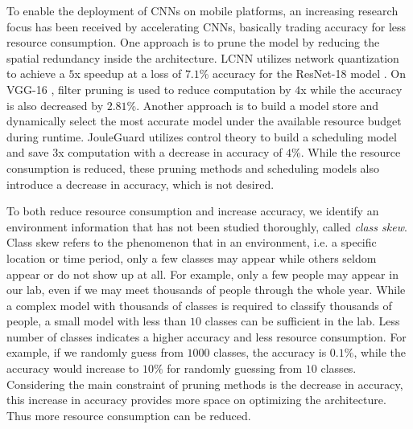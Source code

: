 \documentclass[pageno]{jpaper}
\begin{document}
To enable the deployment of CNNs on mobile platforms, an increasing research focus has been received by accelerating CNNs, basically trading accuracy for less resource consumption. One approach is to prune the model by reducing the spatial redundancy inside the architecture. LCNN \cite{bagherinezhad2017lcnn} utilizes network quantization to achieve a $5$x speedup at a loss of $7.1$\% accuracy for the ResNet-18 model \cite{he2016deep}. On VGG-16 \cite{simonyan2014very}, filter pruning \cite{lin2018accelerating} is used to reduce computation by $4$x while the accuracy is also decreased by $2.81$\%. Another approach is to build a model store and dynamically select the most accurate model under the available resource budget during runtime. JouleGuard \cite{hoffmann2015jouleguard} utilizes control theory to build a scheduling model and save $3$x computation with a decrease in accuracy of $4$\%. While the resource consumption is reduced, these pruning methods and scheduling models also introduce a decrease in accuracy, which is not desired.


To both reduce resource consumption and increase accuracy, we identify an environment information that has not been studied thoroughly, called \textit{class skew}. Class skew refers to the phenomenon that in an environment, i.e. a specific location or time period, only a few classes may appear while others seldom appear or do not show up at all. For example, only a few people may appear in our lab, even if we may meet thousands of people through the whole year. While a complex model with thousands of classes is required to classify thousands of people, a small model with less than $10$ classes can be sufficient in the lab. Less number of classes indicates a higher accuracy and less resource consumption. For example, if we randomly guess from $1000$ classes, the accuracy is $0.1\%$, while the accuracy would increase to $10\%$ for randomly guessing from $10$ classes. Considering the main constraint of pruning methods is the decrease in accuracy, this increase in accuracy provides more space on optimizing the architecture. Thus more resource consumption can be reduced.
\end{document}
